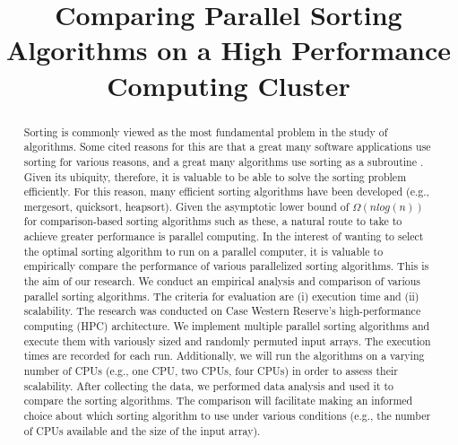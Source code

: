 \documentclass[conference]{IEEEtran}
\begin{document}
		\title{Comparing Parallel Sorting Algorithms on a High Performance Computing Cluster}
			\author{
			\and
			\and
			\and
			}
	\maketitle
	
\begin{abstract}
Sorting is commonly viewed as the most fundamental problem in the study of algorithms. Some cited reasons for this are that a great many software applications use sorting for various reasons, and a great many algorithms use sorting as a subroutine \cite{cormen_introduction_2009}. 
Given its ubiquity, therefore, it is valuable to be able to solve the sorting problem efficiently. 
For this reason, many efficient sorting algorithms have been developed (e.g., mergesort, quicksort, heapsort). 
Given the asymptotic lower bound of $\Omega(nlog(n))$ for comparison-based sorting algorithms such as these, a natural route to take to achieve greater performance is parallel computing. 
In the interest of wanting to select the optimal sorting algorithm to run on a parallel computer, it is valuable to empirically compare the performance of various parallelized sorting algorithms. 
This is the aim of our research. 
We conduct an empirical analysis and comparison of various parallel sorting algorithms. 
The criteria for evaluation are (i) execution time and (ii) scalability. 
The research was conducted on Case Western Reserve’s high-performance computing (HPC) architecture. 
We implement multiple parallel sorting algorithms and execute them with variously sized and randomly permuted input arrays. The execution times are recorded for each run. 
Additionally, we will run the algorithms on a varying number of CPUs (e.g., one CPU, two CPUs, four CPUs) in order to assess their scalability.
After collecting the data, we performed data analysis and used it to compare the sorting algorithms. 
The comparison will facilitate making an informed choice about which sorting algorithm to use under various conditions (e.g., the number of CPUs available and the size of the input array).
\end{abstract}
\end{document}
